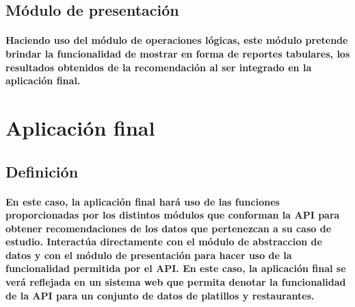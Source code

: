   \subsection{Módulo de presentación}
    \paragraph{Haciendo uso del módulo de operaciones lógicas, este módulo pretende brindar la funcionalidad de mostrar en forma de reportes tabulares, los resultados obtenidos de la recomendación al ser integrado en la aplicación final.}

\section{Aplicación final}
  \subsection{Definición}
    \paragraph{En este caso, la aplicación final hará uso de las funciones proporcionadas por los distintos módulos que conforman la API para obtener recomendaciones de los datos que pertenezcan a su caso de estudio. Interactúa directamente con el módulo de abstraccion de datos y con el módulo de presentación para hacer uso de la funcionalidad permitida por el API. En este caso, la aplicación final se verá reflejada en un sistema web que permita denotar la funcionalidad de la API para un conjunto de datos de platillos y restaurantes.}